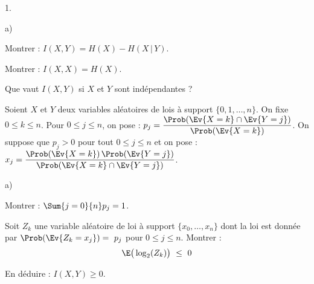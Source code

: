 \documentclass[11pt]{article}%
\begin{document}
\begin{noliste}{1.}
\begin{noliste}{a)}
  \item Montrer : $I(X,Y) = H(X) - H(X \, | \, Y)$.
    
  \item Montrer : $I(X,X) = H(X)$.
    
  \item Que vaut $I(X,Y)$ si $X$ et $Y$ sont indépendantes ?
  \end{noliste}


  \newpage
  
  
\item Soient $X$ et $Y$ deux variables aléatoires de lois à support
  $\{0,1, \ldots, n\}$. On fixe $0 \leq k \leq n$. Pour $0 \leq j \leq
  n$, on pose : $p_j = \dfrac{\Prob(\Ev{X = k} \cap \Ev{Y = j})}{
    \Prob(\Ev{X = k})}$. On suppose que $p_j >0$ pour tout $0 \leq j
  \leq n$ et on pose : $x_j = \dfrac{\Prob(\Ev{X = k}) \, \Prob(\Ev{Y
      = j})}{\Prob(\Ev{X = k} \cap \Ev{Y = j})}$.
  \begin{noliste}{a)}
    \setlength{\itemsep}{2mm}
  \item Montrer : $\Sum{j=0}{n} p_j = 1$.
    
  \item Soit $Z_k$ une variable aléatoire de loi à support $\{x_0,
    \ldots, x_n \}$ dont la loi est donnée par $\Prob(\Ev{Z_k = x_j})
    =~p_j$ pour $0 \leq j \leq n$. Montrer :
    \[
      \E\big( \log_2(Z_k) \big) \ \leq \ 0
    \]
    
  \item En déduire : $I(X,Y) \geq 0$.
  \end{noliste}
\end{noliste}
\end{document}
